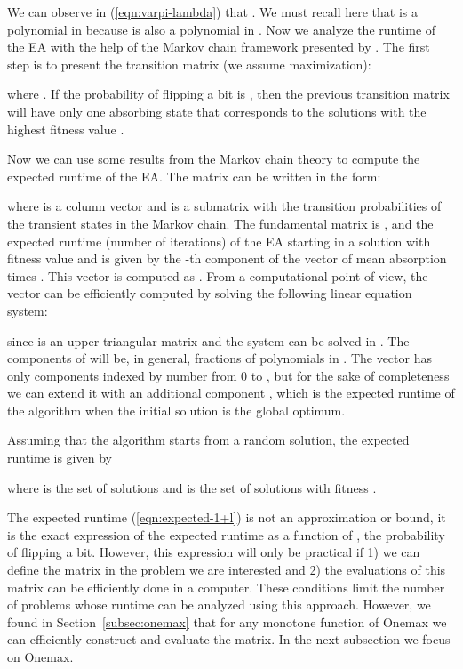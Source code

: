 \documentclass{article}
\begin{document}
We can observe in (\ref{eqn:varpi-lambda}) that . We must recall here that  is a polynomial in  because  is also a polynomial in . Now we analyze the runtime of the  EA with the help of the Markov chain framework presented by \cite{He:Yao2003}. The first step is to present the transition matrix (we assume maximization):

where . If the probability  of flipping a bit is , then the previous transition matrix will have only one absorbing state that corresponds to the solutions with the highest fitness value .

Now we can use some results from the Markov chain theory \citep{Iosifescu1980} to compute the expected runtime of the  EA. The  matrix can be written in the form:

where  is a column vector and  is a  submatrix with the transition probabilities of the transient states in the Markov chain. The fundamental matrix is , and the expected runtime (number of iterations) of the  EA starting in a solution with fitness value  and  is given by the -th component of the vector of mean absorption times . This vector is computed as . From a computational point of view, the vector can be efficiently computed by solving the following linear equation system:

since  is an upper triangular matrix and the system can be solved in . The components of  will be, in general, fractions of polynomials in . The vector  has only  components indexed by number from 0 to , but for the sake of completeness we can extend it with an additional component , which is the expected runtime of the algorithm when the initial solution is the global optimum.

Assuming that the algorithm starts from a random solution, the expected runtime is given by

where  is the set of solutions and  is the set of solutions with fitness .

The expected runtime (\ref{eqn:expected-1+l}) is not an approximation or bound, it is the exact expression of the expected runtime as a function of , the probability of flipping a bit. However, this expression will only be practical if 1) we can define the  matrix in the problem we are interested and 2) the evaluations of this matrix can be efficiently done in a computer. These conditions limit the number of problems whose runtime can be analyzed using this approach. However, we found in Section~\ref{subsec:onemax} that for any monotone function of Onemax we can efficiently construct and evaluate the  matrix. In the next subsection we focus on Onemax.
\end{document}
